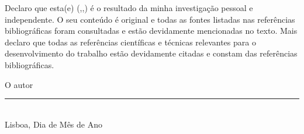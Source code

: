 \makeatletter
Declaro que esta(e) \MakeLowercase{\thedoctypestr(\iselthesis@opt@docdegree,\iselthesis@opt@doctype,\iselthesis@opt@coverlang)} é o resultado da minha investigação pessoal e independente. O seu conteúdo é original e todas as fontes listadas nas referências bibliográficas foram consultadas e estão devidamente mencionadas no texto. Mais declaro que todas as referências científicas e técnicas relevantes para o desenvolvimento do trabalho estão devidamente citadas e constam das referências bibliográficas.
\makeatother
\begin{center}
O autor
\\[3em]

\rule{.5\textwidth}{1pt}
\\[.5em]
\fontsize{10}{12.2}
\selectfont
Lisboa, Dia de Mês de Ano
\end{center}

